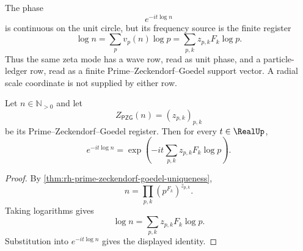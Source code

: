 \begin{principle}
\label{prin:rh-prime-zeckendorf-goedel-particle-ledger}
The phase
$$
e^{-it\log n}
$$
is continuous on the unit circle, but its frequency source is the
finite register
$$
\log n
=
\sum_p v_p(n)\log p
=
\sum_{p,k}z_{p,k}F_k\log p.
$$
Thus the same zeta mode has a wave row, read as unit phase, and a
particle-ledger row, read as a finite
Prime--Zeckendorf--Goedel support vector. A radial scale coordinate is
not supplied by either row.
\end{principle}

\begin{theorem}
\label{thm:rh-single-mode-continuous-discrete-bridge}
Let $n\in\mathbb N_{>0}$ and let
$$
Z_{\mathsf{PZG}}(n)=(z_{p,k})_{p,k}
$$
be its Prime--Zeckendorf--Goedel register. Then for every
$t\in\RealUp$,
$$
e^{-it\log n}
=
\exp\left(
-it\sum_{p,k}z_{p,k}F_k\log p
\right).
$$
\end{theorem}

\begin{proof}
By \autoref{thm:rh-prime-zeckendorf-goedel-uniqueness},
$$
n
=
\prod_{p,k}\left(p^{F_k}\right)^{z_{p,k}}.
$$
Taking logarithms gives
$$
\log n
=
\sum_{p,k}z_{p,k}F_k\log p.
$$
Substitution into $e^{-it\log n}$ gives the displayed identity.
\end{proof}
